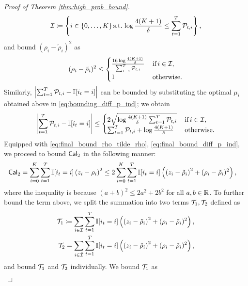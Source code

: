 \begin{proof}[Proof of Theorem \ref{thm:high_prob_bound}]
\begin{align}
    \cI \coloneqq \bigcurl{i \in \{0, \dots, K\} \text{\,s.t.\,} \log \frac{4(K + 1)}{\delta} \le \sum_{t = 1} ^ {T} \cP_{t, i}},
\end{align}
and bound ${(\rho_{i} - \tilde{\rho}_{i})} ^ 2$ as \begin{align}\label{eq:final_bound_rho_tilde_rho}
    {(\rho_{i} - \tilde{\rho}_{i})^2} \le \begin{cases}
         {\frac{16\log \frac{4(K + 1)}{\delta}}{\sum_{t = 1} ^ {T} \cP_{t, i}}} & \text{\,if\,}i \in \cI,  \\
        1 & \text{\,otherwise}.
    \end{cases}
\end{align}
Similarly, $\abs{\sum_{t = 1} ^ {T} \cP_{t, i} - \ind{i_{t} = i}}$ can be bounded by substituting the optimal $\mu_{i}$ obtained above in \eqref{eq:bounding_diff_p_ind}; we obtain 
\begin{align}\label{eq:final_bound_diff_p_ind}
    \abs{\sum_{t = 1} ^ {T} \cP_{t, i} - \ind{i_{t} = i}} \le \begin{cases}
        2\sqrt{\log \frac{4 (K + 1)}{\delta}\sum_{t = 1} ^ {T} \cP_{t, i}} & \text{\,if\,} i \in \cI, \\
        \sum_{t = 1} ^ {T} \cP_{t, i} + \log \frac{4(K + 1)}{\delta} & \text{\,otherwise}.
    \end{cases}
\end{align}
Equipped with \eqref{eq:final_bound_rho_tilde_rho}, \eqref{eq:final_bound_diff_p_ind}, we proceed to bound $\cal_{2}$ in the following manner: \begin{align*}
    \cal_{2} &= \sum_{i = 0} ^ {K} \sum_{t = 1} ^ {T} \ind{i_{t} = i} \bigc{z_{i} - \rho_{i}} ^ 2  \le 2\sum_{i = 0} ^ {K}\sum_{t = 1} ^ {T} \ind{i_{t} = i} \bigc{\bigc{z_{i} - \tilde{\rho}_i} ^ 2 + (\rho_{i} - \tilde{\rho}_i) ^ 2},
\end{align*}
where the inequality is because $(a + b)^2 \le 2 a^2 + 2b ^ 2$ for all $a, b \in \Rn$. To further bound the term above, we split the summation into two terms $\cT_{1}, \cT_{2}$ defined as \begin{align*}
    \cT_{1} \coloneqq \sum_{i \in \cI} \sum_{t = 1} ^ {T} \ind{i_{t} = i} \bigc{\bigc{z_{i} - \tilde{\rho}_i} ^ 2 + (\rho_{i} - \tilde{\rho}_i) ^ 2}, \\
    \cT_{2} = \sum_{i \in \bar{\cI}} \sum_{t = 1} ^ {T} \ind{i_{t} = i} \bigc{\bigc{z_{i} - \tilde{\rho}_i} ^ 2 + (\rho_{i} - \tilde{\rho}_i) ^ 2},
\end{align*}
and bound $\cT_{1}$ and $\cT_{2}$ individually. We bound $\cT_{1}$ as \begin{align*}

\end{align*}
\end{proof}
